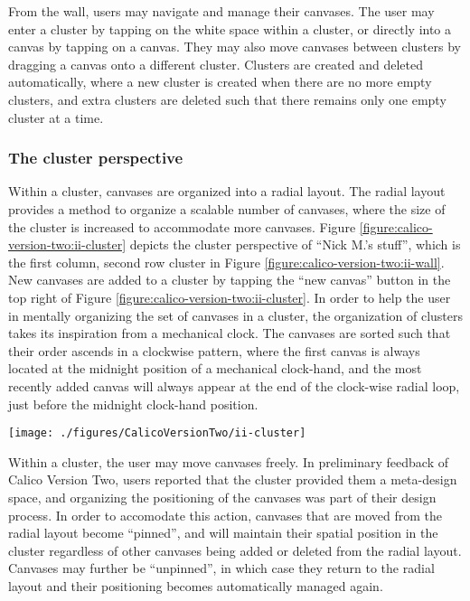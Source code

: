 \documentclass[12pt,fleqn]{ucithesis}
\begin{document}
From the wall, users may navigate and manage their canvases. The user may enter a cluster by tapping on the white space within a cluster, or directly into a canvas by tapping on a canvas. They may also move canvases between clusters by dragging a canvas onto a different cluster. Clusters are created and deleted automatically, where a new cluster is created when there are no more empty clusters, and extra clusters are deleted such that there remains only one empty cluster at a time.

\subsubsection{The cluster perspective}

Within a cluster, canvases are organized into a radial layout. The radial layout provides a method to organize a scalable number of canvases, where the size of the cluster is increased to accommodate more canvases. Figure \ref{figure:calico-version-two:ii-cluster} depicts the cluster perspective of ``Nick M.'s stuff'', which is the first column, second row cluster in Figure \ref{figure:calico-version-two:ii-wall}. New canvases are added to a cluster by tapping the ``new canvas'' button in the top right of Figure \ref{figure:calico-version-two:ii-cluster}. In order to help the user in mentally organizing the set of canvases in a cluster, the organization of clusters takes its inspiration from a mechanical clock. The canvases are sorted such that their order ascends in a clockwise pattern, where the first canvas is always located at the midnight position of a mechanical clock-hand, and the most recently added canvas will always appear at the end of the clock-wise radial loop, just before the midnight clock-hand position. 

\begin{figure*}[tbh]
  \centering
  \texttt{[image: ./figures/CalicoVersionTwo/ii-cluster]}
  \caption{The cluster perspective of ``Nick M.'s stuff''.}
  \label{figure:calico-version-two:ii-cluster}
\end{figure*}

Within a cluster, the user may move canvases freely. In preliminary feedback of Calico Version Two, users reported that the cluster provided them a meta-design space, and organizing the positioning of the canvases was part of their design process. In order to accomodate this action, canvases that are moved from the radial layout become ``pinned'', and will maintain their spatial position in the cluster regardless of other canvases being added or deleted from the radial layout. Canvases may further be ``unpinned'', in which case they return to the radial layout and their positioning becomes automatically managed again.
\end{document}
